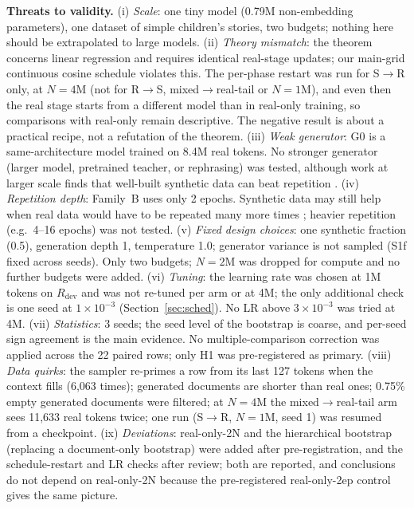 \documentclass[conference]{IEEEtran}
\newcommand{\SR}{S$\to$R}
\newcommand{\RS}{R$\to$S}
\newcommand{\MRT}{mixed$\to$real-tail}
\begin{document}
\textbf{Threats to validity.}
(i) \emph{Scale}: one tiny model (0.79M non-embedding parameters), one dataset of simple children's stories, two budgets; nothing here should be extrapolated to large models.
(ii) \emph{Theory mismatch}: the theorem concerns linear regression and requires identical real-stage updates; our main-grid continuous cosine schedule violates this. The per-phase restart was run for \SR{} only, at $N{=}4$M (not for \RS{}, \MRT{} or $N{=}1$M), and even then the real stage starts from a different model than in real-only training, so comparisons with real-only remain descriptive. The negative result is about a practical recipe, not a refutation of the theorem.
(iii) \emph{Weak generator}: G0 is a same-architecture model trained on 8.4M real tokens. No stronger generator (larger model, pretrained teacher, or rephrasing) was tested, although work at larger scale finds that well-built synthetic data can beat repetition \cite{yang2025sbp,maini2025beyondweb}.
(iv) \emph{Repetition depth}: Family~B uses only 2 epochs. Synthetic data may still help when real data would have to be repeated many more times \cite{muennighoff2023scaling}; heavier repetition (e.g.\ 4--16 epochs) was not tested.
(v) \emph{Fixed design choices}: one synthetic fraction (0.5), generation depth 1, temperature 1.0; generator variance is not sampled (S1f fixed across seeds). Only two budgets; $N{=}2$M was dropped for compute and no further budgets were added.
(vi) \emph{Tuning}: the learning rate was chosen at 1M tokens on $R_{\text{dev}}$ and was not re-tuned per arm or at 4M; the only additional check is one seed at $1\times10^{-3}$ (Section~\ref{sec:sched}). No LR above $3\times10^{-3}$ was tried at 4M.
(vii) \emph{Statistics}: 3 seeds; the seed level of the bootstrap is coarse, and per-seed sign agreement is the main evidence. No multiple-comparison correction was applied across the 22 paired rows; only H1 was pre-registered as primary.
(viii) \emph{Data quirks}: the sampler re-primes a row from its last 127 tokens when the context fills (6,063 times); generated documents are shorter than real ones; 0.75\% empty generated documents were filtered; at $N{=}4$M the \MRT{} arm sees 11,633 real tokens twice; one run (\SR, $N{=}1$M, seed 1) was resumed from a checkpoint.
(ix) \emph{Deviations}: real-only-2N and the hierarchical bootstrap (replacing a document-only bootstrap) were added after pre-registration, and the schedule-restart and LR checks after review; both are reported, and conclusions do not depend on real-only-2N because the pre-registered real-only-2ep control gives the same picture.
\end{document}
